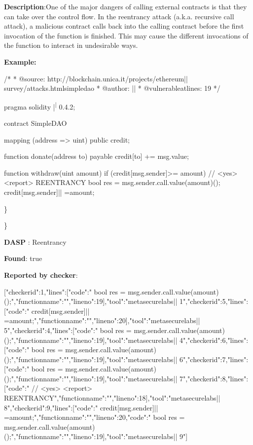 \documentclass{article}
\begin{document}
\textbf{Description}:One of the major dangers of calling external contracts is that they can take over the control flow. In the reentrancy attack (a.k.a. recursive call attack), a malicious contract calls back into the calling contract before the first invocation of the function is finished. This may cause the different invocations of the function to interact in undesirable ways.


\textbf{Example:} 
\begin{ffcode} 

/*
* @source: http://blockchain.unica.it/projects/ethereum|\textendash| survey/attacks.htmlsimpledao
* @author: |\textendash| 
* @vulnerable\textunderscore at\textunderscore lines: 19
*/

pragma solidity |\textsuperscript| 0.4.2;

contract SimpleDAO {
  mapping (address => uint) public credit;

  function donate(address to) payable {
    credit[to] += msg.value;
  }

  function withdraw(uint amount) {
    if (credit[msg.sender]>= amount) {
      // <yes> <report> REENTRANCY
      bool res = msg.sender.call.value(amount)();
      credit[msg.sender]|\textendash| =amount;
    }
  }
}

\end{ffcode} 
\} 

\} 

\textbf{DASP} : Reentrancy

\textbf{Found}: true

\textbf{Reported by checker}: 
\begin{ffcode} 

[{"checker\textunderscore id":1,"lines":[{"code":"      bool res = msg.sender.call.value(amount)();\n","function\textunderscore name":"","line\textunderscore no":19}],"tool":"metasecurelabs|\textendash| 1"},{"checker\textunderscore id":5,"lines":[{"code":"      credit[msg.sender]|\textendash| =amount;\n","function\textunderscore name":"","line\textunderscore no":20}],"tool":"metasecurelabs|\textendash| 5"},{"checker\textunderscore id":4,"lines":[{"code":"      bool res = msg.sender.call.value(amount)();\n","function\textunderscore name":"","line\textunderscore no":19}],"tool":"metasecurelabs|\textendash| 4"},{"checker\textunderscore id":6,"lines":[{"code":"      bool res = msg.sender.call.value(amount)();\n","function\textunderscore name":"","line\textunderscore no":19}],"tool":"metasecurelabs|\textendash| 6"},{"checker\textunderscore id":7,"lines":[{"code":"      bool res = msg.sender.call.value(amount)();\n","function\textunderscore name":"","line\textunderscore no":19}],"tool":"metasecurelabs|\textendash| 7"},{"checker\textunderscore id":8,"lines":[{"code":"      // <yes> <report> REENTRANCY\n","function\textunderscore name":"","line\textunderscore no":18}],"tool":"metasecurelabs|\textendash| 8"},{"checker\textunderscore id":9,"lines":[{"code":"      credit[msg.sender]|\textendash| =amount;\n","function\textunderscore name":"","line\textunderscore no":20},{"code":"      bool res = msg.sender.call.value(amount)();\n","function\textunderscore name":"","line\textunderscore no":19}],"tool":"metasecurelabs|\textendash| 9"}]
\end{ffcode} 
\end{document}
